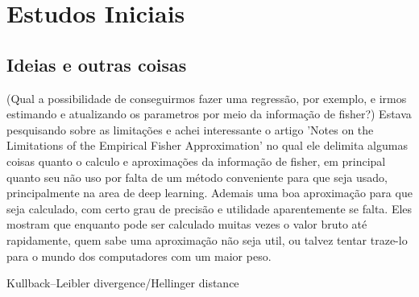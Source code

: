 \documentclass{report}[12pt]
\author{}
\date{}
\begin{document}
\chapter{Estudos Iniciais}
\section{Ideias e outras coisas}
(Qual a possibilidade de conseguirmos fazer uma regressão, por exemplo, e irmos estimando e atualizando
os parametros por meio da informação de fisher?)
Estava pesquisando sobre as limitações e achei interessante o artigo 'Notes on the Limitations of the Empirical Fisher Approximation'
no qual ele delimita algumas coisas quanto o calculo e aproximações da informação de fisher, em principal
quanto seu não uso por falta de um método conveniente para que seja usado, principalmente na area de
deep learning. Ademais uma boa aproximação para que seja calculado, com certo grau de precisão e utilidade
aparentemente se falta. Eles mostram que enquanto pode ser calculado muitas vezes o valor bruto até 
rapidamente, quem sabe uma aproximação não seja util, ou talvez tentar traze-lo para o mundo dos computadores
com um maior peso.\par

Kullback–Leibler divergence/Hellinger distance
\end{document}
